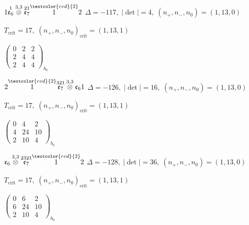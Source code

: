 \documentclass[10pt]{article}
\begin{document}
\smallskip

$1\overset{1}{\mathfrak{e}_6}\overset{3,3}{\otimes}\overset{21}{\mathfrak{e}_7}\overset{\textcolor{red}{2}}{1}2$ \quad $\Delta=-117,\; |\det|=4,\; (n_+,n_-,n_0)=(1,13,0)$

\hspace{1em}$T_{\text{crit}}=17,\; (n_+,n_-,n_0)_{\text{crit}}=(1,13,1)$

\hspace{2em}$\left(\begin{smallmatrix}0 & 2 & 2 \\ 2 & 4 & 4 \\ 2 & 4 & 4\end{smallmatrix}\right)_{\!b_0}$

\smallskip

$2\overset{\textcolor{red}{2}}{1}\overset{321}{\mathfrak{e}_7}\overset{3,3}{\otimes}\mathfrak{e}_61$ \quad $\Delta=-126,\; |\det|=16,\; (n_+,n_-,n_0)=(1,13,0)$

\hspace{1em}$T_{\text{crit}}=17,\; (n_+,n_-,n_0)_{\text{crit}}=(1,13,1)$

\hspace{2em}$\left(\begin{smallmatrix}0 & 4 & 2 \\ 4 & 24 & 10 \\ 2 & 10 & 4\end{smallmatrix}\right)_{\!b_0}$

\smallskip

$\mathfrak{e}_6\overset{3,3}{\otimes}\overset{2321}{\mathfrak{e}_7}\overset{\textcolor{red}{2}}{1}2$ \quad $\Delta=-128,\; |\det|=36,\; (n_+,n_-,n_0)=(1,13,0)$

\hspace{1em}$T_{\text{crit}}=17,\; (n_+,n_-,n_0)_{\text{crit}}=(1,13,1)$

\hspace{2em}$\left(\begin{smallmatrix}0 & 6 & 2 \\ 6 & 24 & 10 \\ 2 & 10 & 4\end{smallmatrix}\right)_{\!b_0}$
\end{document}
